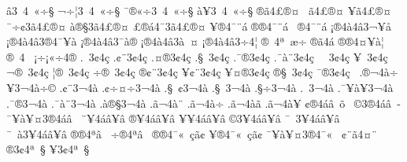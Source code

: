 {^^ad^^e23^^a04^^ad^^a0^^ab^^f7^^a7
^^ac^^f7^^a63^^a04^^ad^^a0^^ab^^f7^^a7
^^af^^ae^^ab^^f73^^a04^^ad^^a0^^ab^^f7^^a7
^^e0^^a53^^a04^^ad^^a0^^ab^^f7^^a7
^^ae^^e34^^a3^^ae^^a4
^^a0^^e34^^a3^^ae^^a4
^^a5^^e34^^a3^^ae^^a4
^^af^^f7^^a23^^e34^^a3^^ae^^a4
^^e0^^ae^^a73^^e34^^a3^^ae^^a4
^^a3^^ae^^e14^^af3^^e34^^a3^^ae^^a4
^^a5^^ae4^^af^^a8^^e1
^^ae^^ae4^^af^^a8^^e1
^^a0^^ae4^^af^^a8^^e1
^^a1^^ae4^^e04^^e23^^ac^^a5^^e5
^^a1^^ae4^^e04^^e23^^ae4^^af^^a5^^e0
^^a1^^ae4^^e04^^e23^^af^^e0^^ae
^^a1^^ae4^^e04^^e23^^e0^^a0^^a4
^^a1^^ae4^^e04^^e23^^f74^^ad^^a6
^^ae^^a04^^aa^^a0^^e6^^f7
^^ae^^e34^^e1
^^ae^^ae4^^a4^^a5^^e0^^a6
^^ae^^a04^^ad^^a0
^^a1^^f7^^a1^^ab^^f74^^ae
.^^ad^^a03^^a24^^e7
.^^a2^^a83^^a24^^e7
.^^a4^^ae3^^a24^^e7
.^^a7^^a03^^a24^^e7
.^^af^^ae3^^a24^^e7
.^^af^^e0^^a83^^a24^^e7
^^a0^^ad^^a03^^a24^^e7
^^a5^^ad^^a03^^a24^^e7
^^ac^^ae^^ad^^a03^^a24^^e7
^^a6^^ae^^ad^^a03^^a24^^e7
^^f7^^ae^^ad^^a03^^a24^^e7
^^ae^^a2^^a83^^a24^^e7
^^a5^^a2^^a83^^a24^^e7
^^a5^^a4^^ae3^^a24^^e7
^^ae^^a7^^a03^^a24^^e7
^^af^^ae3^^a24^^e7^^a0
.^^ae^^ac4^^e0^^f7
^^a53^^ac4^^e0^^f7^^a9
.^^a2^^a83^^ac4^^e0
.^^a2^^f7^^a4^^f73^^ac4^^e0
.^^a7^^a0^^a23^^ac4^^e0
.^^a7^^a03^^ac4^^e0
.^^a7^^f73^^ac4^^e0
.^^ad^^a03^^ac4^^e0
.^^af^^a5^^e0^^a53^^ac4^^e0
.^^af^^ae3^^ac4^^e0
.^^af^^e0^^a83^^ac4^^e0
.^^e0^^ae^^a73^^ac4^^e0
.^^e3^^ac4^^e0^^a8
.^^e3^^ac4^^e0^^f7
.^^e3^^ac4^^e0^^e3
.^^e3^^ac4^^e0^^a5
^^a2^^ae4^^e1^^e2^^a0^^ad^^ad^^f5
^^ad^^a0^^a93^^ae4^^e1^^e2^^a0^^ad^^ad
^^af^^a5^^e0^^a5^^a43^^ae4^^e1^^e2^^a0^^ad^^ad
^^a8^^a54^^e1^^e2^^a5^^e2  
^^ae^^a54^^e1^^e2^^a5^^e2  
^^a5^^a54^^e1^^e2^^a5^^e2  
^^a93^^a54^^e1^^e2^^a5^^e2  
^^af^^a0^^ad3^^a54^^e1^^e2^^a5^^e2
^^af^^a0^^e03^^a54^^e1^^e2^^a5^^e2
^^ae^^ae4^^aa^^e2^^a0^^ad
^^f7^^ae4^^aa^^e2^^a0^^ad
^^ae^^ae4^^af^^ab^^a0^^e7^^e3^^a2
^^a5^^ae4^^af^^ab^^a0^^e7^^e3^^a2
^^af^^a5^^e0^^a5^^a43^^ae4^^af^^ab^^a0
^^a2^^a8^^e34^^a4^^a8
^^ae3^^a24^^aa^^a0^^a7
^^a53^^a24^^aa^^a0^^a7
}
